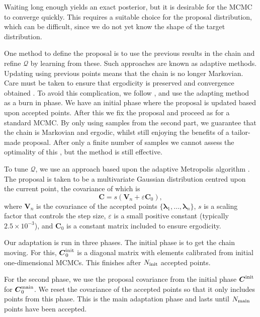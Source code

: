 Waiting long enough yields an exact posterior, but it is desirable for the MCMC to converge quickly. This requires a suitable choice for the proposal distribution, which can be difficult, since we do not yet know the shape of the target distribution.

One method to define the proposal is to use the previous results in the chain and refine $\mathcal{Q}$ by learning from these. Such approaches are known as adaptive methods. Updating using previous points means that the chain is no longer Markovian. Care must be taken to ensure that ergodicity is preserved and convergence obtained \citep{Roberts2007,Andrieu2008}. To avoid this complication, we follow \citet{Haario1999}, and use the adapting method as a burn in phase. We have an initial phase where the proposal is updated based upon accepted points. After this we fix the proposal and proceed as for a standard MCMC. By only using samples from the second part, we guarantee that the chain is Markovian and ergodic, whilst still enjoying the benefits of a tailor-made proposal. After only a finite number of samples we cannot assess the optimality of this \citep{Andrieu2008}, but the method is still effective.

To tune $\mathcal{Q}$, we use an approach based upon the adaptive Metropolis algorithm \citep{Haario2001}. The proposal is taken to be a multivariate Gaussian distribution centred upon the current point, the covariance of which is
\begin{equation}
\boldsymbol{C} = s \left(\boldsymbol{V}_n + \varepsilon\boldsymbol{C}_0\right),
\end{equation}
where $\boldsymbol{V}_n$ is the covariance of the accepted points $\{\boldsymbol{\lambda}_1,\ldots,\boldsymbol{\lambda}_n\}$, $s$ is a scaling factor that controls the step size, $\varepsilon$ is a small positive constant (typically $2.5 \times 10^{-3}$), and $\boldsymbol{C}_0$ is a constant matrix included to ensure ergodicity.

Our adaptation is run in three phases. The initial phase is to get the chain moving. For this, $\boldsymbol{C}_0^\mathrm{init}$ is a diagonal matrix with elements calibrated from initial one-dimensional MCMCs. This finishes after $N_\mathrm{init}$ accepted points.

For the second phase, we use the proposal covariance from the initial phase $\boldsymbol{C}^\mathrm{init}$ for $\boldsymbol{C}_0^\mathrm{main}$. We reset the covariance of the accepted points so that it only includes points from this phase. This is the main adaptation phase and lasts until $N_\mathrm{main}$ points have been accepted.

